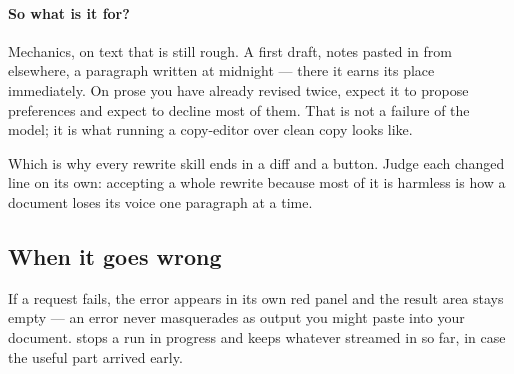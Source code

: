 \paragraph{So what is it for?}
Mechanics, on text that is still rough. A first draft, notes pasted in from
elsewhere, a paragraph written at midnight --- there it earns its place
immediately. On prose you have already revised twice, expect it to propose
preferences and expect to decline most of them. That is not a failure of the
model; it is what running a copy-editor over clean copy looks like.

Which is why every rewrite skill ends in a diff and a button. Judge each
changed line on its own: accepting a whole rewrite because most of it is
harmless is how a document loses its voice one paragraph at a time.

\subsection{When it goes wrong}

If a request fails, the error appears in its own red panel and the result area
stays empty --- an error never masquerades as output you might paste into your
document.  stops a run in progress and keeps whatever streamed in so
far, in case the useful part arrived early.
